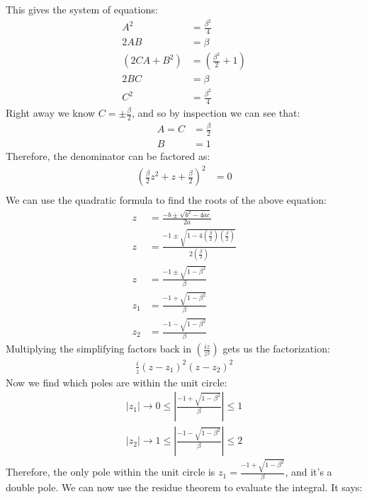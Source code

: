 \begin{example}
    This gives the system of equations:
    \begin{align*}
        A^2         & =  \frac{\beta^2}{4}     \\
        2AB         & = \beta                  \\
        (2CA + B^2) & =(\frac{\beta^2}{2} + 1) \\
        2BC         & = \beta                  \\
        C^2         & = \frac{\beta^2}{4}
    \end{align*}
    Right away we know $C = \pm \frac{\beta}{2}$, and so by inspection we can see that:
    \begin{align*}
        A = C & = \frac{\beta}{2} \\
        B     & = 1
    \end{align*}
    Therefore, the denominator can be factored as:
    \begin{align*}
        \left(\frac{\beta}{2}z^2 + z + \frac{\beta}{2}\right)^2 & = 0 \\
    \end{align*}
    We can use the quadratic formula to find the roots of the above equation:
    \begin{align*}
        z   & = \frac{-b\pm\sqrt{b^2-4ac}}{2a}                                               \\
        z   & = \frac{-1\pm\sqrt{1-4(\frac{\beta}{2})(\frac{\beta}{2})}}{2(\frac{\beta}{2})} \\
        z   & = \frac{-1\pm\sqrt{1-\beta^2}}{\beta}                                          \\
        z_1 & = \frac{-1+\sqrt{1-\beta^2}}{\beta}                                            \\
        z_2 & = \frac{-1-\sqrt{1-\beta^2}}{\beta}
    \end{align*}
    Multiplying the simplifying factors back in $(\frac{iz}{z^2})$ gets us the factorization:
    \begin{align*}
        \frac{i}{z}(z - z_1)^2(z - z_2)^2
    \end{align*}
    Now we find which poles are within the unit circle:
    \begin{align*}
        |z_1| \rightarrow 0 \leq \left|\frac{-1+\sqrt{1-\beta^2}}{\beta}\right| \leq 1 \\
        |z_2| \rightarrow 1 \leq \left|\frac{-1-\sqrt{1-\beta^2}}{\beta}\right| \leq 2
    \end{align*}
    Therefore, the only pole within the unit circle is $z_1 = \frac{-1+\sqrt{1-\beta^2}}{\beta}$, and it's a double pole. We can now use the residue theorem to evaluate the integral. It says:

\end{example}
